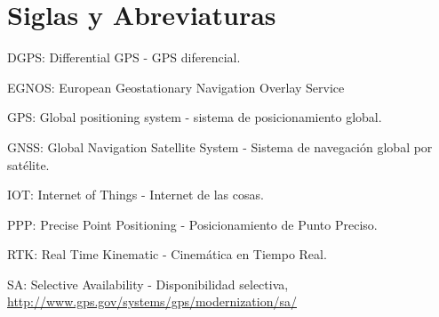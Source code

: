\chapter{Siglas y Abreviaturas}
\label{sec:siglas}

DGPS: Differential GPS - GPS diferencial.

EGNOS: European Geostationary Navigation Overlay Service

GPS: Global positioning system - sistema de posicionamiento global.

GNSS: Global Navigation Satellite System - Sistema de navegación global por satélite.

IOT: Internet of Things - Internet de las cosas.

PPP: Precise Point Positioning - Posicionamiento de Punto Preciso.

RTK: Real Time Kinematic - Cinemática en Tiempo Real.

SA: Selective Availability - Disponibilidad selectiva, \url{http://www.gps.gov/systems/gps/modernization/sa/}
